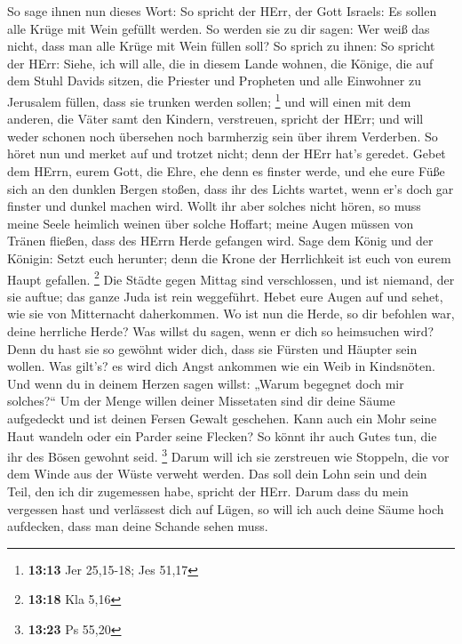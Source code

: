  So sage ihnen nun dieses Wort: So spricht der HErr, der
Gott Israels: Es sollen alle Krüge mit Wein gefüllt werden. So werden
sie zu dir sagen: Wer weiß das nicht, dass man alle Krüge mit Wein
füllen soll?  So sprich zu ihnen: So spricht der HErr:
Siehe, ich will alle, die in diesem Lande wohnen, die Könige, die auf
dem Stuhl Davids sitzen, die Priester und Propheten und alle Einwohner
zu Jerusalem füllen, dass sie trunken werden sollen; \footnote{\textbf{13:13}
  Jer 25,15-18; Jes 51,17}  und will einen mit dem anderen,
die Väter samt den Kindern, verstreuen, spricht der HErr; und will weder
schonen noch übersehen noch barmherzig sein über ihrem Verderben.
 So höret nun und merket auf und trotzet nicht; denn der
HErr hat's geredet.  Gebet dem HErrn, eurem Gott, die Ehre,
ehe denn es finster werde, und ehe eure Füße sich an den dunklen Bergen
stoßen, dass ihr des Lichts wartet, wenn er's doch gar finster und
dunkel machen wird.  Wollt ihr aber solches nicht hören, so
muss meine Seele heimlich weinen über solche Hoffart; meine Augen müssen
von Tränen fließen, dass des HErrn Herde gefangen wird. 
Sage dem König und der Königin: Setzt euch herunter; denn die Krone der
Herrlichkeit ist euch von eurem Haupt gefallen. \footnote{\textbf{13:18}
  Kla 5,16}  Die Städte gegen Mittag sind verschlossen, und
ist niemand, der sie auftue; das ganze Juda ist rein weggeführt.
 Hebet eure Augen auf und sehet, wie sie von Mitternacht
daherkommen. Wo ist nun die Herde, so dir befohlen war, deine herrliche
Herde?  Was willst du sagen, wenn er dich so heimsuchen
wird? Denn du hast sie so gewöhnt wider dich, dass sie Fürsten und
Häupter sein wollen. Was gilt's? es wird dich Angst ankommen wie ein
Weib in Kindsnöten.  Und wenn du in deinem Herzen sagen
willst: „Warum begegnet doch mir solches?{}`` Um der Menge willen deiner
Missetaten sind dir deine Säume aufgedeckt und ist deinen Fersen Gewalt
geschehen.  Kann auch ein Mohr seine Haut wandeln oder ein
Parder seine Flecken? So könnt ihr auch Gutes tun, die ihr des Bösen
gewohnt seid. \footnote{\textbf{13:23} Ps 55,20}  Darum
will ich sie zerstreuen wie Stoppeln, die vor dem Winde aus der Wüste
verweht werden.  Das soll dein Lohn sein und dein Teil, den
ich dir zugemessen habe, spricht der HErr. Darum dass du mein vergessen
hast und verlässest dich auf Lügen,  so will ich auch deine
Säume hoch aufdecken, dass man deine Schande sehen muss. 
